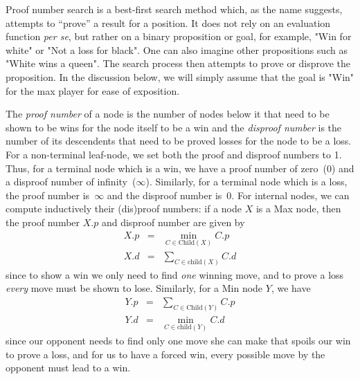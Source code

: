 \documentclass[10pt,dvipdfmx,letterpaper]{report}
\begin{document}
Proof number search is a best-first search method which, as the name suggests, attempts
to ``prove'' a result for a position.  It does not rely on an evaluation function {\it per se},
but rather on a binary proposition or goal, for example, "Win for white" or "Not a loss for black".
One can also imagine other propositions such as "White wins a queen".
The search process then attempts to prove or disprove the proposition.
In the discussion below, we will simply assume that the goal is "Win" for the max player for
ease of exposition.

The {\it proof number} of a node is the number of nodes below it that need to
be shown to be wins for the node itself to be a win and the {\it disproof number}
is the number of its descendents that need to be proved losses for the node to be a loss.
For a non-terminal leaf-node, we set both the proof and disproof numbers to 1.
Thus, for a terminal node which is a win, we have a proof number of zero~($0$) and a disproof number of infinity~($\infty$).
Similarly, for a terminal node which is a loss, the proof number is~$\infty$ and the disproof number is~$0$.
For internal nodes, we can compute inductively their (dis)proof numbers: if a node $X$ is a Max node,
then the proof number $X.p$ and disproof number are given by
\begin{eqnarray*}
X.p &=& \min_{C\in\text{Child}(X)} C.p \\
X.d &=& \sum_{C\in\text{child}(X)} C.d
\end{eqnarray*}
since to show a win we only need to find {\em one} winning move,
and to prove a loss {\em every} move must be shown to lose.
Similarly, for a Min node $Y$, we have
\begin{eqnarray*}
Y.p &=& \sum_{C\in\text{Child}(Y)} C.p \\
Y.d &=& \min_{C\in\text{child}(Y)} C.d
\end{eqnarray*}
since our opponent needs to find only one move she can make that spoils our win to prove a loss,
and for us to have a forced win, every possible move by the opponent must lead to a win.
\end{document}
